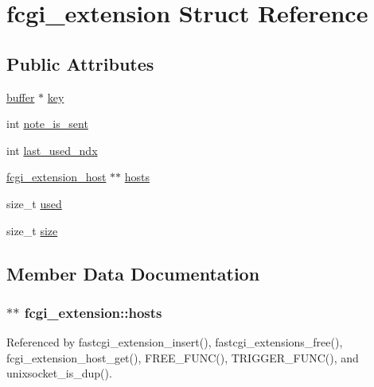 \hypertarget{structfcgi__extension}{\section{fcgi\-\_\-extension Struct Reference}
\label{structfcgi__extension}
}
\subsection*{Public Attributes}
\begin{DoxyCompactItemize}
\item 
\hyperlink{structbuffer}{buffer} $\ast$ \hyperlink{structfcgi__extension_ad01e793a5144bf18839c36ce1915edf0}{key}
\item 
int \hyperlink{structfcgi__extension_a34041eea2feaac460ffa873833d7687b}{note\-\_\-is\-\_\-sent}
\item 
int \hyperlink{structfcgi__extension_a29d77acd6c009cc488e6ec9ec2231276}{last\-\_\-used\-\_\-ndx}
\item 
\hyperlink{structfcgi__extension__host}{fcgi\-\_\-extension\-\_\-host} $\ast$$\ast$ \hyperlink{structfcgi__extension_a618377c3afa0a34206ea94d81d4d8120}{hosts}
\item 
size\-\_\-t \hyperlink{structfcgi__extension_a3c0e38fb6c0db1a484b5a50a61a9d58b}{used}
\item 
size\-\_\-t \hyperlink{structfcgi__extension_a97ac0e5e8eb55c2b3238a98c9c5e6897}{size}
\end{DoxyCompactItemize}


\subsection{Member Data Documentation}
\hypertarget{structfcgi__extension_a618377c3afa0a34206ea94d81d4d8120}{
\subsubsection[{hosts}]{$\ast$$\ast$ fcgi\-\_\-extension\-::hosts}}\label{structfcgi__extension_a618377c3afa0a34206ea94d81d4d8120}


Referenced by fastcgi\-\_\-extension\-\_\-insert(), fastcgi\-\_\-extensions\-\_\-free(), fcgi\-\_\-extension\-\_\-host\-\_\-get(), F\-R\-E\-E\-\_\-\-F\-U\-N\-C(), T\-R\-I\-G\-G\-E\-R\-\_\-\-F\-U\-N\-C(), and unixsocket\-\_\-is\-\_\-dup().

